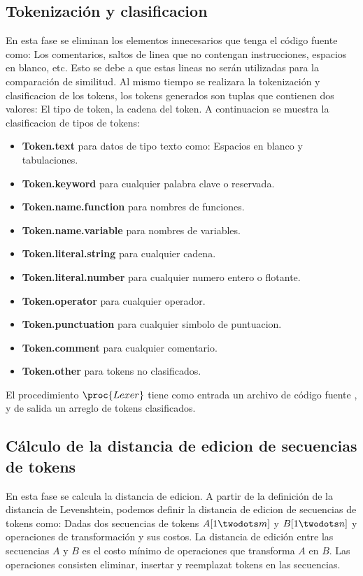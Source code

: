 \subsection{Tokenización y clasificacion}
En esta fase se eliminan los elementos innecesarios que tenga el código fuente como: Los comentarios, saltos de linea que no contengan instrucciones, espacios en blanco, etc. Esto se debe a que estas lineas no serán utilizadas para la comparación de similitud. Al mismo tiempo se realizara la tokenización y clasificacion de los tokens, los tokens generados son tuplas que contienen dos valores: El tipo de token, la cadena del token. A continuacion se muestra la clasificacion de tipos de tokens:
\begin{itemize}
  \item \textbf{Token.text} para datos de tipo texto como: Espacios en blanco y  tabulaciones.
  \item \textbf{Token.keyword} para cualquier palabra clave o reservada.
  \item \textbf{Token.name.function} para nombres de funciones.
  \item \textbf{Token.name.variable} para nombres de variables.
  \item \textbf{Token.literal.string} para cualquier cadena.
  \item \textbf{Token.literal.number} para cualquier numero entero o flotante.
  \item \textbf{Token.operator} para cualquier operador.
  \item \textbf{Token.punctuation} para cualquier simbolo de puntuacion.
  \item \textbf{Token.comment} para cualquier comentario.
  \item \textbf{Token.other} para tokens no clasificados.
\end{itemize}



El procedimiento $\proc{Lexer}$ tiene como entrada un archivo de código fuente , y de salida un arreglo de tokens clasificados.



\subsection{Cálculo de la distancia de edicion de secuencias de tokens}
En esta fase se calcula la distancia de edicion. A partir de la definición de la distancia de Levenshtein, podemos definir la distancia de edicion de secuencias de tokens como: Dadas dos secuencias de tokens $A[1 \twodots m]$ y $B[1 \twodots n]$ y operaciones de transformación y sus costos. La distancia de edición entre las secuencias $A$ y $B$ es el costo mínimo de operaciones que transforma $A$ en $B$. Las operaciones consisten eliminar, insertar y reemplazat tokens en las secuencias.

